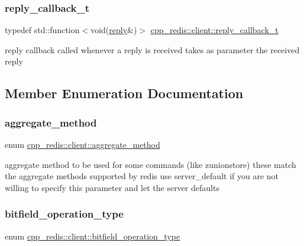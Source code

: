 \subsubsection{\texorpdfstring{reply\+\_\+callback\+\_\+t}{reply\_callback\_t}}
{\footnotesize\ttfamily typedef std\+::function$<$void(\hyperlink{classcpp__redis_1_1reply}{reply}\&)$>$ \hyperlink{classcpp__redis_1_1client_a061a1140d36d2eaeda82b09a0bb3f9f2}{cpp\+\_\+redis\+::client\+::reply\+\_\+callback\+\_\+t}}

reply callback called whenever a reply is received takes as parameter the received reply 

\subsection{Member Enumeration Documentation}
\mbox{\label{classcpp__redis_1_1client_aa197ca5b36da793c701d3ba388ec4946}} 
\subsubsection{\texorpdfstring{aggregate\+\_\+method}{aggregate\_method}}
{\footnotesize\ttfamily enum \hyperlink{classcpp__redis_1_1client_aa197ca5b36da793c701d3ba388ec4946}{cpp\+\_\+redis\+::client\+::aggregate\+\_\+method}\hspace{0.3cm}{\ttfamily [strong]}}

aggregate method to be used for some commands (like zunionstore) these match the aggregate methods supported by redis use server\+\_\+default if you are not willing to specify this parameter and let the server defaults \mbox{\label{classcpp__redis_1_1client_a2e2023534299541da0a659802e2f087d}} 
\subsubsection{\texorpdfstring{bitfield\+\_\+operation\+\_\+type}{bitfield\_operation\_type}}
{\footnotesize\ttfamily enum \hyperlink{classcpp__redis_1_1client_a2e2023534299541da0a659802e2f087d}{cpp\+\_\+redis\+::client\+::bitfield\+\_\+operation\+\_\+type}\hspace{0.3cm}{\ttfamily [strong]}}

